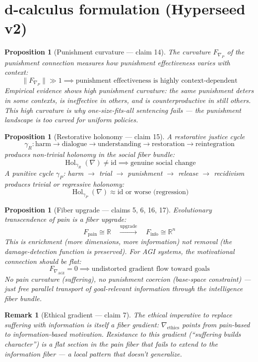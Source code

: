 \documentclass[11pt,a4paper]{article}
\newtheorem{proposition}[definition]{Proposition}
\newtheorem{remark}[definition]{Remark}
\begin{document}
\section{d-calculus formulation (Hyperseed v2)}

\begin{proposition}[Punishment curvature --- claim 14]
\label{prop:curvature}
The curvature $F_{\nabla_P}$ of the punishment connection measures how
punishment effectiveness varies with context:
\[
  \|F_{\nabla_P}\| \gg 1 \implies \text{punishment effectiveness is
    highly context-dependent}
\]
Empirical evidence shows high punishment curvature: the same punishment
deters in some contexts, is ineffective in others, and is counterproductive
in still others. This high curvature is why one-size-fits-all sentencing
fails --- the punishment landscape is too curved for uniform policies.
\end{proposition}

\begin{proposition}[Restorative holonomy --- claim 15]
\label{prop:holonomy}
A restorative justice cycle
\[
  \gamma_R: \text{harm} \to \text{dialogue} \to \text{understanding}
    \to \text{restoration} \to \text{reintegration}
\]
produces non-trivial holonomy in the social fiber bundle:
\[
  \operatorname{Hol}_{\gamma_R}(\nabla) \neq \mathrm{id}
  \implies \text{genuine social change}
\]
A punitive cycle $\gamma_P$: harm $\to$ trial $\to$ punishment $\to$
release $\to$ recidivism produces trivial or regressive holonomy:
\[
  \operatorname{Hol}_{\gamma_P}(\nabla) \approx \mathrm{id}
  \text{ or worse (regression)}
\]
\end{proposition}

\begin{proposition}[Fiber upgrade --- claims 5, 6, 16, 17]
\label{prop:upgrade}
Evolutionary transcendence of pain is a fiber upgrade:
\[
  F_{\text{pain}} \cong \mathbb{R} \quad \xrightarrow{\text{upgrade}} \quad
  F_{\text{info}} \cong \mathbb{R}^n
\]
This is enrichment (more dimensions, more information) not removal
(the damage-detection function is preserved). For AGI systems, the
motivational connection should be flat:
\[
  F_{\nabla_{\text{AGI}}} = 0 \implies \text{undistorted gradient flow
    toward goals}
\]
No pain curvature (suffering), no punishment coercion (base-space
constraint) --- just free parallel transport of goal-relevant information
through the intelligence fiber bundle.
\end{proposition}

\begin{remark}[Ethical gradient --- claim 7]
The ethical imperative to replace suffering with information is itself
a fiber gradient: $\nabla_{\text{ethics}}$ points from pain-based to
information-based motivation. Resistance to this gradient (``suffering
builds character'') is a flat section in the pain fiber that fails to
extend to the information fiber --- a local pattern that doesn't
generalize.
\end{remark}
\end{document}
